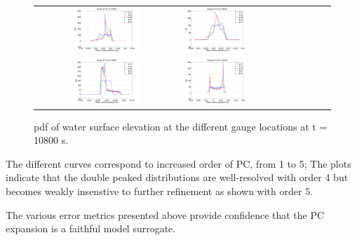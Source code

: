 \begin{figure}[h]
\centering
\begin{tabular}{clc}
        
\includegraphics[width=0.5\textwidth]{./figures/pdfs1_3.pdf} &
\includegraphics[width=0.5\textwidth]{./figures/pdfs2_3.pdf} \\
\includegraphics[width=0.5\textwidth]{./figures/pdfs3_3.pdf} &
\includegraphics[width=0.5\textwidth]{./figures/pdfs4_3.pdf}
\end{tabular}
\caption{pdf of water surface elevation at the different gauge locations at t = 10800 s.}
\label{fig:pdfs3}
\end{figure}
The different curves
correspond to increased order of PC, from 1 to 5; 
The plots indicate that the double peaked distributions are
well-resolved with order  4 but becomes weakly insenstive to further refinement 
as shown with order 5.

The various error metrics presented above 
provide confidence that the PC expansion is a faithful 
model surrogate. 

\clearpage

